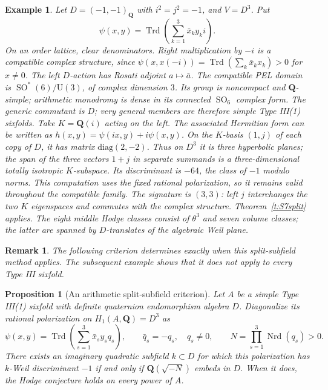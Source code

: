 \documentclass[11pt,reqno]{article}
\theoremstyle{emphasizedplain}
\newtheorem{proposition}[theorem]{Proposition}
\theoremstyle{emphasizeddefinition}
\newtheorem{example}[theorem]{Example}
\theoremstyle{emphasizeddefinition}
\newtheorem{remark}[theorem]{Remark}
\DeclareMathOperator{\SO}{SO}
\DeclareMathOperator{\Trd}{Trd}
\newcommand{\Q}{\mathbf Q}
\begin{document}
\begin{example}\label{ex:hamilton}
Let $D=(-1,-1)_\Q$ with $i^2=j^2=-1$, and $V=D^3$. Put
\[
 \psi(x,y)=\Trd\left(\sum_{k=1}^3\bar x_k y_k i\right).
\]
On an order lattice, clear denominators. Right multiplication by $-i$ is
a compatible complex structure, since
$\psi(x,x(-i))=\Trd(\sum_k\bar x_kx_k)>0$ for $x\ne0$.
The left $D$-action has Rosati adjoint $a\mapsto\bar a$.
The compatible PEL domain is $\SO^*(6)/\mathrm U(3)$, of complex dimension
$3$. Its group is noncompact and $\Q$-simple; arithmetic monodromy is dense
in its connected $\SO_6$ complex form. The generic commutant is $D$;
very general members are therefore simple Type III(1) sixfolds.
Take $K=\Q(i)$ acting on the left. The associated Hermitian form can be
written as $h(x,y)=\psi(ix,y)+i\psi(x,y)$. On the $K$-basis $(1,j)$ of
each copy of $D$, it has matrix $\mathrm{diag}(2,-2)$.
Thus on $D^3$ it is three hyperbolic planes; the span of the three vectors
$1+j$ in separate summands is a three-dimensional totally isotropic
$K$-subspace. Its discriminant is $-64$, the class of $-1$ modulo norms.
This computation uses the fixed rational polarization, so it remains valid
throughout the compatible family. The signature is $(3,3)$: left $j$
interchanges the two $K$ eigenspaces and commutes with the complex
structure. Theorem~\ref{t:S7split} applies. The eight middle Hodge classes
consist of $\theta^3$ and seven volume classes; the latter are spanned by
$D$-translates of the algebraic Weil plane.
\end{example}
\begin{remark}
The following criterion determines exactly when this split-subfield
method applies. The subsequent example shows that it does not apply
to every Type III sixfold.
\end{remark}
\begin{proposition}[An arithmetic split-subfield criterion]
\label{p:quaternion-split-test}
Let $A$ be a simple Type III(1) sixfold with definite quaternion
endomorphism algebra $D$. Diagonalize its rational polarization on
$H_1(A,\Q)=D^3$ as
\[
 \psi(x,y)=\Trd\!\left(\sum_{s=1}^3\bar x_s y_s q_s\right),
 \qquad \bar q_s=-q_s,\quad q_s\ne0,
 \qquad N=\prod_{s=1}^3\operatorname{Nrd}(q_s)>0.
\]
There exists an imaginary quadratic subfield $k\subset D$ for which
this polarization has $k$-Weil discriminant $-1$ if and only if
$\Q(\sqrt{-N})$ embeds in $D$. When it does, the Hodge conjecture
holds on every power of $A$.
\end{proposition}
\end{document}
